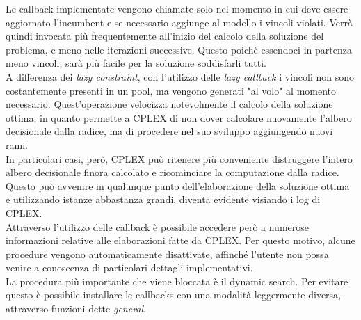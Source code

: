 Le callback implementate vengono chiamate solo nel momento in cui deve essere aggiornato l'incumbent e se necessario aggiunge al modello i vincoli violati. Verrà quindi invocata più frequentemente all'inizio del calcolo della soluzione del problema, e meno nelle iterazioni successive. Questo poichè essendoci in partenza meno vincoli, sarà più facile per la soluzione soddisfarli tutti.\\
A differenza dei \textit{lazy constraint}, con l'utilizzo delle \textit{lazy callback} i vincoli non sono costantemente presenti in un pool, ma vengono generati "al volo" al momento necessario.  Quest'operazione velocizza notevolmente il calcolo della soluzione ottima, in quanto permette a CPLEX di non dover calcolare nuovamente l'albero decisionale dalla radice, ma di procedere nel suo sviluppo aggiungendo nuovi rami.\\
In particolari casi, però, CPLEX può ritenere più conveniente distruggere l'intero albero decisionale finora calcolato e ricominciare la computazione dalla radice. Questo può avvenire in qualunque punto dell'elaborazione della soluzione ottima e utilizzando istanze abbastanza grandi, diventa evidente visiando i log di CPLEX.\\
Attraverso l'utilizzo delle callback è possibile accedere però a numerose informazioni relative alle elaborazioni fatte da CPLEX. Per questo motivo, alcune procedure vengono automaticamente disattivate, affinché l'utente non possa venire a conoscenza di particolari dettagli implementativi.\\
La procedura più importante che viene bloccata è il dynamic search.
Per evitare questo è possibile installare le callbacks con una modalità leggermente diversa, attraverso funzioni dette \textit{general}.

